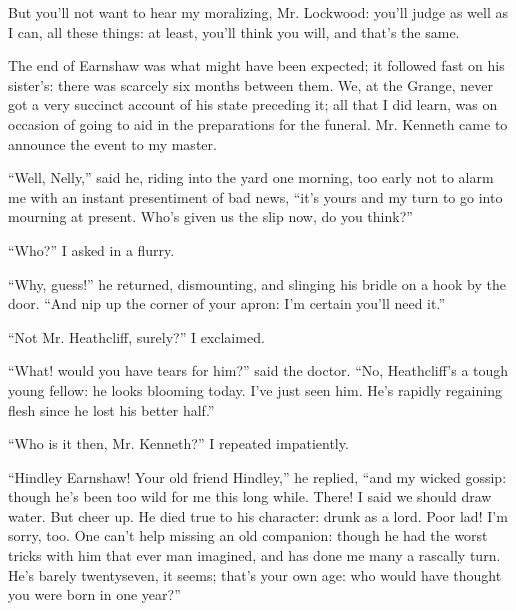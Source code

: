 \par But you'll not want to hear my moralizing, Mr. Lockwood: you'll judge as well as I can, all these things: at least, you'll think you will, and that's the same.
\par The end of Earnshaw was what might have been expected; it followed fast on his sister's: there was scarcely six months between them. We, at the Grange, never got a very succinct account of his state preceding it; all that I did learn, was on occasion of going to aid in the preparations for the funeral. Mr. Kenneth came to announce the event to my master.
\par “Well, Nelly,” said he, riding into the yard one morning, too early not to alarm me with an instant presentiment of bad news, “it's yours and my turn to go into mourning at present. Who's given us the slip now, do you think?”
\par “Who?” I asked in a flurry.
\par “Why, guess!” he returned, dismounting, and slinging his bridle on a hook by the door. “And nip up the corner of your apron: I'm certain you'll need it.”
\par “Not Mr. Heathcliff, surely?” I exclaimed.
\par “What! would you have tears for him?” said the doctor. “No, Heathcliff's a tough young fellow: he looks blooming today. I've just seen him. He's rapidly regaining flesh since he lost his better half.”
\par “Who is it then, Mr. Kenneth?” I repeated impatiently.
\par “Hindley Earnshaw! Your old friend Hindley,” he replied, “and my wicked gossip: though he's been too wild for me this long while. There! I said we should draw water. But cheer up. He died true to his character: drunk as a lord. Poor lad! I'm sorry, too. One can't help missing an old companion: though he had the worst tricks with him that ever man imagined, and has done me many a rascally turn. He's barely twentyseven, it seems; that's your own age: who would have thought you were born in one year?”
